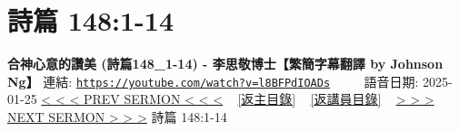 \documentclass{book}
\begin{document}
\section{詩篇 148:1-14}
\label{sec:l8BFPdIOADs}
\textbf{合神心意的讚美 (詩篇148\_1-14) - 李思敬博士【繁簡字幕翻譯 by Johnson Ng】}
\newline
\newline
連結: \href{https://youtube.com/watch?v=l8BFPdIOADs}{\texttt{https://youtube.com/watch?v=l8BFPdIOADs}} ~~~~ 語音日期: 2025-01-25
\newline
\newline
\hyperref[sec:AXMhGkS0eVE]{< < < PREV SERMON < < <}
~
\hyperlink{toc}{[返主目錄]}
~
\hyperref[ch:preacher5]{[返講員目錄]}
~
\hyperref[sec:xOqiVXdmrRE]{> > > NEXT SERMON > > >}
\newline
\newline
詩篇 148:1-14
\newline
\end{document}
